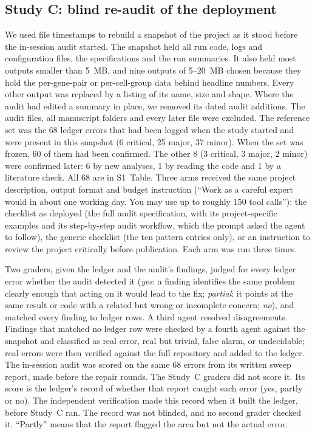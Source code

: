 \subsection*{Study C: blind re-audit of the deployment}
We used file timestamps to rebuild a snapshot of the project as it stood
before the in-session audit started. The snapshot held all run code, logs
and configuration files, the specifications and the run summaries. It
also held most outputs smaller than 5~MB, and nine outputs of 5--20~MB
chosen because they hold the per-gene-pair or per-cell-group data behind
headline numbers. Every other output was replaced by a listing of its
name, size and shape. Where the audit had edited a summary in place, we
removed its dated audit additions. The audit files, all manuscript folders and
every later file were excluded. The reference set was the 68 ledger
errors that had been logged when the study started and were present in
this snapshot (6 critical, 25 major, 37 minor). When the set was frozen,
60 of them had been confirmed. The other 8 (3 critical, 3 major, 2 minor)
were confirmed later: 6 by new analyses, 1 by reading the code and 1 by
a literature check. All 68 are in S1~Table. Three arms received
the same project description, output format and budget instruction
(``Work as a careful expert would in about one working day. You may use
up to roughly 150 tool calls''): the checklist as deployed (the full
audit specification, with its project-specific examples and its step-by-step audit workflow, which
the prompt asked the agent to follow), the generic checklist (the ten
pattern entries only), or an instruction to review the project critically
before publication. Each arm was run three times.

Two graders, given the ledger and the audit's findings, judged for every
ledger error whether the audit detected it (\emph{yes}: a finding
identifies the same problem clearly enough that acting on it would lead
to the fix; \emph{partial}: it points at the same result or code with a
related but wrong or incomplete concern; \emph{no}), and matched every
finding to ledger rows. A third agent resolved disagreements. Findings
that matched no ledger row were checked by a fourth agent against the
snapshot and classified as real error, real but trivial, false alarm, or
undecidable; real errors were then verified against the full repository
and added to the ledger. The in-session audit was scored on the same 68
errors from its written sweep report, made before the repair rounds. The
Study~C graders did not score it. Its score is the ledger's record of
whether that report caught each error (yes, partly or no). The
independent verification made this record when it built the ledger,
before Study~C ran. The record was not blinded, and no second grader
checked it. ``Partly'' means that the report flagged
the area but not the actual error.

